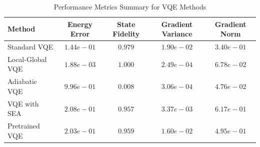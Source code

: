 \begin{table}[h!]
\centering
\caption{Performance Metrics Summary for VQE Methods}
\label{tab:performance_metrics}
\begin{tabular}{lcccc}
\hline
\textbf{Method} & \textbf{Energy Error} & \textbf{State Fidelity} & \textbf{Gradient Variance} & \textbf{Gradient Norm} \\
\hline
Standard VQE & $1.44e-01$ & $0.979$ & $1.90e-02$ & $3.40e-01$ \\
Local-Global VQE & $1.88e-03$ & $1.000$ & $2.49e-04$ & $6.78e-02$ \\
Adiabatic VQE & $9.96e-01$ & $0.008$ & $3.06e-04$ & $4.76e-02$ \\
VQE with SEA & $2.08e-01$ & $0.957$ & $3.37e-03$ & $6.17e-01$ \\
Pretrained VQE & $2.03e-01$ & $0.959$ & $1.60e-02$ & $4.95e-01$ \\
\hline
\end{tabular}
\end{table}